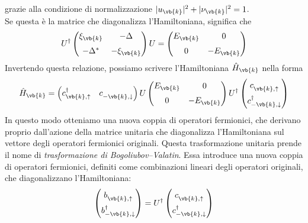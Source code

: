 grazie alla condizione di normalizzazione
$|u_{\vb{k}}|^2+|\nu_{\vb{k}}|^2=1$.\\
Se questa è la matrice che diagonalizza l'Hamiltoniana, significa che
\begin{equation*}
   U^{\dag}
   \begin{pmatrix}
      \xi_{\vb{k}} & -\Delta\\[0.2cm]
      -\Delta^* & -\xi_{\vb{k}}
   \end{pmatrix}
   U
   =
   \begin{pmatrix}
      E_{\vb{k}} & 0\\[0.2cm]
      0 & -E_{\vb{k}}
   \end{pmatrix}
\end{equation*}
Invertendo questa relazione, possiamo scrivere l'Hamiltoniana $\hat{H}_{\vb{k}}$ nella forma
\begin{equation*}
   \hat{H}_{\vb{k}}
   =
   \begin{pmatrix}
      c^{\dag}_{\vb{k},\uparrow}
      &
      c^{\vphantom{\dag}}_{-\vb{k},\downarrow}
   \end{pmatrix}
   U
   \begin{pmatrix}
      E_{\vb{k}} & 0\\[0.2cm]
      0 & -E_{\vb{k}}
   \end{pmatrix}
   U^{\dag}
   \begin{pmatrix}
      c^{\vphantom{\dag}}_{\vb{k},\uparrow}\\[0.2cm]
      c^{\dag}_{-\vb{k},\downarrow}
   \end{pmatrix}
\end{equation*}
In questo modo otteniamo una nuova coppia di operatori fermionici, che derivano proprio dall'azione della matrice unitaria che diagonalizza l'Hamiltoniana sul vettore degli operatori fermionici originali. Questa trasformazione unitaria prende il nome di \textit{trasformazione di Bogoliubov--Valatin}. Essa introduce una nuova coppia di operatori fermionici, definiti come combinazioni lineari degli operatori originali, che diagonalizzano l'Hamiltoniana:
\begin{equation}
   \begin{pmatrix}
      b^{\vphantom{\dag}}_{\vb{k},\uparrow}\\[0.2cm]
      b^{\dag}_{-\vb{k},\downarrow}
   \end{pmatrix}
   =
   U^{\dag}
   \begin{pmatrix}
      c^{\vphantom{\dag}}_{\vb{k},\uparrow}\\[0.2cm]
      c^{\dag}_{-\vb{k},\downarrow}
   \end{pmatrix}
   \label{eq:Bogoliubov_Valatin_transformation}
\end{equation}
